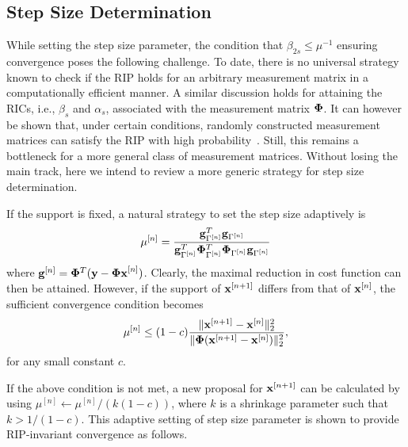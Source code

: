 \documentclass{article}
\begin{document}
\subsection{Step Size Determination} 
While setting the step size parameter, the condition that $\beta_{2s}\leq\mu^{-1}$ ensuring convergence poses the following challenge. To date, there is no universal strategy known to check if the RIP holds for an arbitrary measurement matrix in a computationally efficient manner. A similar discussion holds for attaining the RICs, i.e., ${\beta_s}$ and $\alpha_s$, associated with the measurement matrix ${\bf \Phi}$. It can however be shown that, under certain conditions, randomly constructed measurement matrices can satisfy
the RIP with high probability~\cite{candes2008rip, chartrand2008rip}. Still, this remains a bottleneck for a more general class of
measurement matrices. Without losing the main track, here we intend to review a more generic strategy for step size determination. 

If the support is fixed, a natural strategy to set the step size adaptively is~\cite{blumensath2010niht}
\begin{equation}\label{step_size}
   \mu^{[n]} = \frac{{\bf g}^T_{\Gamma^{[n]}}{\bf g}_{\Gamma^{[n]}}}{{\bf g}^T_{\Gamma^{[n]}}{\bf \Phi}^T_{\Gamma^{[n]}}{\bf \Phi}_{\Gamma^{[n]}}{\bf g}_{\Gamma^{[n]}}}
\end{equation}
where ${\bf g}^{[n]} = {\bf \Phi}^T({\bf y}-{\bf \Phi x}^{[n]})$. Clearly, the maximal reduction in cost function can then be attained. However, if the support of ${\bf x}^{[n+1]}$ differs from that of ${\bf x}^{[n]}$, the sufficient convergence condition  becomes
\begin{equation}
    \mu^{[n]} \leq(1-c) \frac{\|{\bf x}^{[n+1]}-{\bf x}^{[n]} \|_2^2}{\|{\bf \Phi}({\bf x}^{[n+1]}-{\bf x}^{[n]}) \|_2^2},
\end{equation}
for any small constant $c$.

If the above condition is not met, a new proposal for ${\bf x}^{[n+1]}$ can be calculated by using $\mu^{[n]}\leftarrow{\mu^{[n]}/(k(1-c))}$, where $k$ is a shrinkage parameter such that $k>1/(1-c)$.
This adaptive setting of step size parameter is shown to provide RIP-invariant convergence  as follows.
\end{document}
